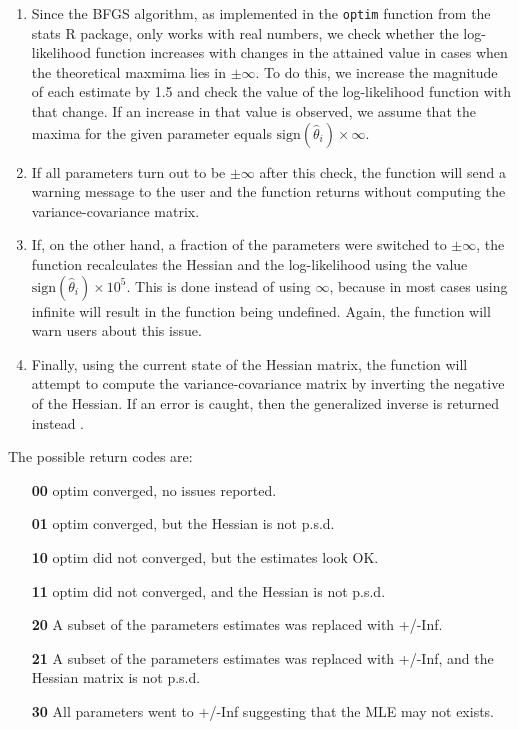 \documentclass[12pt]{article}
\begin{document}
\begin{enumerate}
	\item Since the BFGS algorithm, as implemented in the \texttt{optim} function from the stats R package, only works with real numbers, we check whether the log-likelihood function increases with changes in the attained value in cases when the theoretical maxmima lies in $\pm\infty$. To do this, we increase the magnitude of each estimate by 1.5 and check the value of the log-likelihood function with that change. If an increase in that value is observed, we assume that the maxima for the given parameter equals $\mbox{sign}(\hat\theta_i)\times\infty$.
	
	\item If all parameters turn out to be $\pm\infty$ after this check, the function will send a warning message to the user and the function returns without computing the variance-covariance matrix.
	
	\item If, on the other hand, a fraction of the parameters were switched to $\pm\infty$, the function recalculates the Hessian and the log-likelihood using the value $\mbox{sign}(\hat \theta_i)\times 10^{5}$. This is done instead of using $\infty$, because in most cases using infinite will result in the function being undefined. Again, the function will warn users about this issue.
	
	\item Finally, using the current state of the Hessian matrix, the function will attempt to compute the variance-covariance matrix by inverting the negative of the Hessian. If an error is caught, then the generalized inverse is returned instead \cite{Gill2004}.
\end{enumerate}

The possible return codes are:

\begin{itemize}
\item[\textbf{00}] optim converged, no issues reported.
\item[\textbf{01}] optim converged, but the Hessian is not p.s.d.
\item[\textbf{10}] optim did not converged, but the estimates look OK.
\item[\textbf{11}] optim did not converged, and the Hessian is not p.s.d.
\item[\textbf{20}] A subset of the parameters estimates was replaced with +/-Inf.
\item[\textbf{21}] A subset of the parameters estimates was replaced with +/-Inf, and the Hessian matrix is not p.s.d.
\item[\textbf{30}] All parameters went to +/-Inf suggesting that the MLE may not exists.
\end{itemize}
\end{document}
